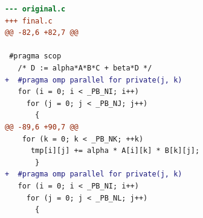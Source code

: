 \begin{lstlisting}[language=diff,basicstyle=\ttfamily\scriptsize,breaklines=true,caption={polybench/2mm — FASTER (e10)}]
--- original.c
+++ final.c
@@ -82,6 +82,7 @@
 
 #pragma scop
   /* D := alpha*A*B*C + beta*D */
+  #pragma omp parallel for private(j, k)
   for (i = 0; i < _PB_NI; i++)
     for (j = 0; j < _PB_NJ; j++)
       {
@@ -89,6 +90,7 @@
 	for (k = 0; k < _PB_NK; ++k)
 	  tmp[i][j] += alpha * A[i][k] * B[k][j];
       }
+  #pragma omp parallel for private(j, k)
   for (i = 0; i < _PB_NI; i++)
     for (j = 0; j < _PB_NL; j++)
       {
\end{lstlisting}

